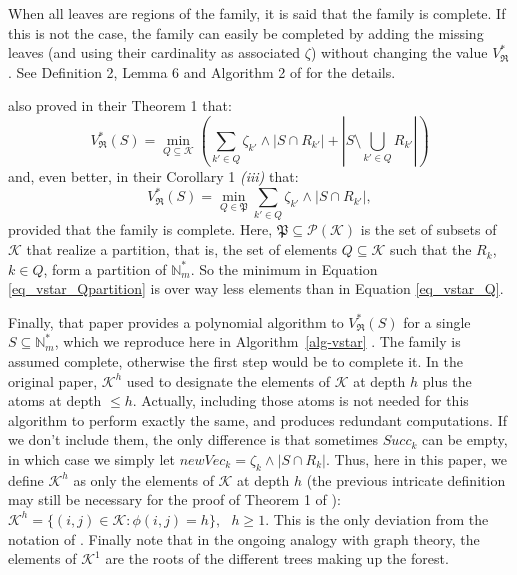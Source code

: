 \documentclass[
  11pt,
  a4paper,
]{article}
\theoremstyle{definition}
\theoremstyle{plain}
\theoremstyle{plain}
\theoremstyle{plain}
\theoremstyle{definition}
\theoremstyle{remark}
\begin{document}
When all leaves are regions of the family, it is said that the family is
complete. If this is not the case, the family can easily be completed by
adding the missing leaves (and using their cardinality as associated
\(\zeta\)) without changing the value \(V^*_{\mathfrak{R}}\). See
Definition 2, Lemma 6 and Algorithm 2 of \citet{MR4178188} for the
details.

\citet{MR4178188} also proved in their Theorem 1 that: \begin{equation}
V^*_{\mathfrak{R}}(S)=\min_{Q\subseteq\mathcal{K}}\left(\sum_{k'\in Q}\zeta_{k'}\wedge|S\cap R_{k'}|+\left| S\setminus\bigcup_{k'\in Q} R_{k'}   \right|\right)
\label{eq_vstar_Q} 
\end{equation} and, even better, in their Corollary 1 \emph{(iii)} that:
\begin{equation}
V^*_{\mathfrak{R}}(S) = \min_{Q\in \mathfrak P}\sum_{k'\in Q}\zeta_{k'}\wedge|S\cap R_{k'}|,
\label{eq_vstar_Qpartition}
\end{equation} provided that the family is complete. Here,
\(\mathfrak P \subseteq \mathcal P(\mathcal{K})\) is the set of subsets
of \(\mathcal{K}\) that realize a partition, that is, the set of
elements \(Q\subseteq\mathcal{K}\) such that the \(R_k\), \(k\in Q\),
form a partition of \(\mathbb{N}_m^*\). So the minimum in Equation
\eqref{eq_vstar_Qpartition} is over way less elements than in Equation
\eqref{eq_vstar_Q}.

Finally, that paper provides a polynomial algorithm to
\(V^*_{\mathfrak{R}}(S)\) for a single \(S\subseteq\mathbb{N}_m^*\),
which we reproduce here in  Algorithm~\ref{alg-vstar} . The family is
assumed complete, otherwise the first step would be to complete it. In
the original paper, \(\mathcal{K}^h\) used to designate the elements of
\(\mathcal{K}\) at depth \(h\) plus the atoms at depth \(\leq h\).
Actually, including those atoms is not needed for this algorithm to
perform exactly the same, and produces redundant computations. If we
don't include them, the only difference is that sometimes \(Succ_k\) can
be empty, in which case we simply let
\(newVec_k=\zeta_k\wedge|S\cap R_k|\). Thus, here in this paper, we
define \(\mathcal{K}^h\) as only the elements of \(\mathcal{K}\) at
depth \(h\) (the previous intricate definition may still be necessary
for the proof of Theorem 1 of \citet{MR4178188}):
\(\mathcal{K}^h=\{ (i,j)\in\mathcal{K}: \phi(i,j)=h      \}, \:\:\:h\geq 1.\)
This is the only deviation from the notation of \citet{MR4178188}.
Finally note that in the ongoing analogy with graph theory, the elements
of \(\mathcal{K}^1\) are the roots of the different trees making up the
forest.
\end{document}
